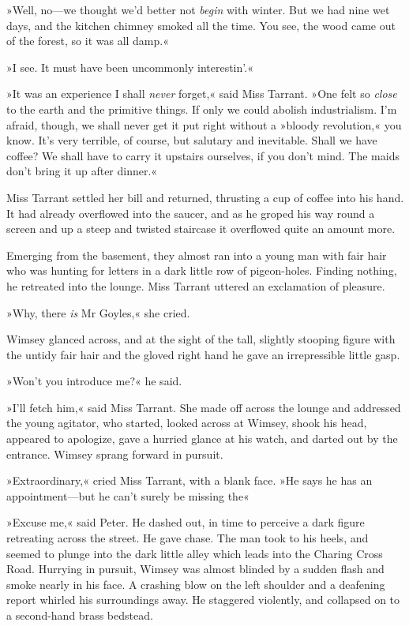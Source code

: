 »Well, no\allowbreak---\allowbreak we thought we'd better not \textit{begin} with winter. But we had nine wet days, and the kitchen chimney smoked all the time. You see, the wood came out of the forest, so it was all damp.«

»I see. It must have been uncommonly interestin'.«

»It was an experience I shall \textit{never} forget,« said Miss Tarrant. »One felt so \textit{close} to the earth and the primitive things. If only we could abolish industrialism. I'm afraid, though, we shall never get it put right without a »bloody revolution,« you know. It's very terrible, of course, but salutary and inevitable. Shall we have coffee? We shall have to carry it upstairs ourselves, if you don't mind. The maids don't bring it up after dinner.«

Miss Tarrant settled her bill and returned, thrusting a cup of coffee into his hand. It had already overflowed into the saucer, and as he groped his way round a screen and up a steep and twisted staircase it overflowed quite an amount more.

Emerging from the basement, they almost ran into a young man with fair hair who was hunting for letters in a dark little row of pigeon-holes.  Finding nothing, he retreated into the lounge. Miss Tarrant uttered an exclamation of pleasure.

»Why, there \textit{is} Mr Goyles,« she cried.

Wimsey glanced across, and at the sight of the tall, slightly stooping figure with the untidy fair hair and the gloved right hand he gave an irrepressible little gasp.

»Won't you introduce me?« he said.

»I'll fetch him,« said Miss Tarrant. She made off across the lounge and addressed the young agitator, who started, looked across at Wimsey, shook his head, appeared to apologize, gave a hurried glance at his watch, and darted out by the entrance. Wimsey sprang forward in pursuit.

»Extraordinary,« cried Miss Tarrant, with a blank face. »He says he has an appointment\allowbreak---\allowbreak but he can't surely be missing the\longdash«

»Excuse me,« said Peter. He dashed out, in time to perceive a dark figure retreating across the street. He gave chase. The man took to his heels, and seemed to plunge into the dark little alley which leads into the Charing Cross Road. Hurrying in pursuit, Wimsey was almost blinded by a sudden flash and smoke nearly in his face. A crashing blow on the left shoulder and a deafening report whirled his surroundings away. He staggered violently, and collapsed on to a second-hand brass bedstead.
